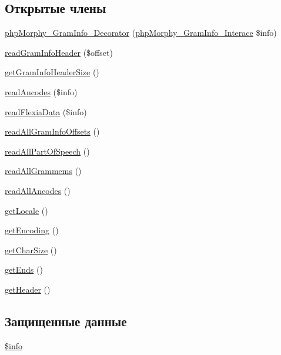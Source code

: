 \subsection*{Открытые члены}
\begin{DoxyCompactItemize}
\item 
\hyperlink{classphpMorphy__GramInfo__Decorator_a9b3df41388da8c742dd354d03f75bbc4}{phpMorphy\_\-GramInfo\_\-Decorator} (\hyperlink{interfacephpMorphy__GramInfo__Interace}{phpMorphy\_\-GramInfo\_\-Interace} \$info)
\item 
\hyperlink{classphpMorphy__GramInfo__Decorator_a0b3f846da88a8e3f7f6b81ece61067ed}{readGramInfoHeader} (\$offset)
\item 
\hyperlink{classphpMorphy__GramInfo__Decorator_a73ccfbb5711ccf48220c05017a19a5c5}{getGramInfoHeaderSize} ()
\item 
\hyperlink{classphpMorphy__GramInfo__Decorator_a64dc470014661163c986515947a5d7f0}{readAncodes} (\$info)
\item 
\hyperlink{classphpMorphy__GramInfo__Decorator_ac033d5ea7e74694f7da919bb4e8d12e1}{readFlexiaData} (\$info)
\item 
\hyperlink{classphpMorphy__GramInfo__Decorator_a6a3e4e55d9ff8ca83a61953d55c892c0}{readAllGramInfoOffsets} ()
\item 
\hyperlink{classphpMorphy__GramInfo__Decorator_a394b51f05970a05e6739ae32aa64eadf}{readAllPartOfSpeech} ()
\item 
\hyperlink{classphpMorphy__GramInfo__Decorator_a9296a1d7b88ee752282e53846556a672}{readAllGrammems} ()
\item 
\hyperlink{classphpMorphy__GramInfo__Decorator_a6042bc4df5f6e0500c503e62156a275b}{readAllAncodes} ()
\item 
\hyperlink{classphpMorphy__GramInfo__Decorator_aa1ad2a569f132fb69deb1b884071eec9}{getLocale} ()
\item 
\hyperlink{classphpMorphy__GramInfo__Decorator_a4a44a1c12f42f59d5c8c4742d07098a8}{getEncoding} ()
\item 
\hyperlink{classphpMorphy__GramInfo__Decorator_ac002661c0fc2b9755ebb38039816e678}{getCharSize} ()
\item 
\hyperlink{classphpMorphy__GramInfo__Decorator_add20afae225bfc1dbe8dca4fe509bc93}{getEnds} ()
\item 
\hyperlink{classphpMorphy__GramInfo__Decorator_a68a7512d48fd6ac30a1ea8ee16348f53}{getHeader} ()
\end{DoxyCompactItemize}
\subsection*{Защищенные данные}
\begin{DoxyCompactItemize}
\item 
\hyperlink{classphpMorphy__GramInfo__Decorator_a2c90c7dfe1dda0b3e6b90d6a3bacac89}{\$info}
\end{DoxyCompactItemize}


